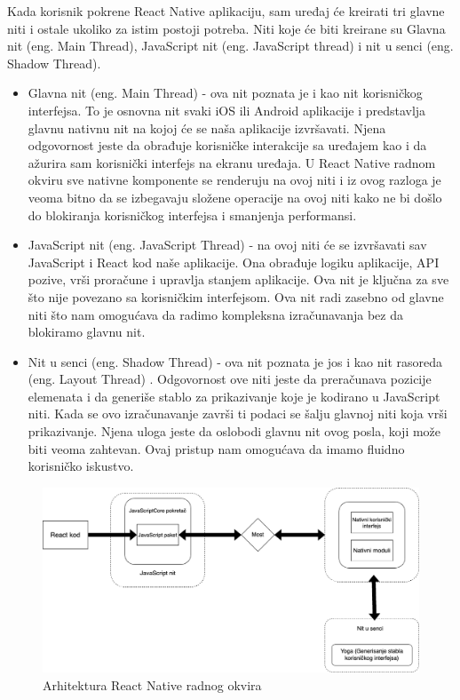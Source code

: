 \documentclass[12pt,oneside]{memoir}
\begin{document}
Kada korisnik pokrene React Native aplikaciju, sam uređaj će kreirati tri glavne niti i ostale ukoliko za istim postoji potreba. Niti koje će biti kreirane su Glavna nit (eng. Main Thread), JavaScript nit (eng. JavaScript thread) i nit u senci (eng. Shadow Thread).

\begin{itemize}
    \item Glavna nit (eng. Main Thread) - ova nit poznata je i kao nit korisničkog interfejsa. To je osnovna nit svaki iOS ili Android aplikacije i predstavlja glavnu nativnu nit na kojoj će se naša aplikacije izvršavati. Njena odgovornost jeste da obrađuje korisničke interakcije sa uređajem kao i da ažurira sam korisnički interfejs na ekranu uređaja. U React Native radnom okviru sve nativne komponente se renderuju na ovoj niti i iz ovog razloga je veoma bitno da se izbegavaju složene operacije na ovoj niti kako ne bi došlo do blokiranja korisničkog interfejsa i smanjenja performansi.
    \item JavaScript nit (eng. JavaScript Thread) - na ovoj niti će se izvršavati sav JavaScript i React kod naše aplikacije. Ona obrađuje logiku aplikacije, API pozive, vrši proračune i upravlja stanjem aplikacije. Ova nit je ključna za sve što nije povezano sa korisničkim interfejsom. Ova nit radi zasebno od glavne niti što nam omogućava da radimo kompleksna izračunavanja bez da blokiramo glavnu nit. 
    \item Nit u senci (eng. Shadow Thread) - ova nit poznata je jos i kao nit rasoreda (eng. Layout Thread) . Odgovornost ove niti jeste da preračunava pozicije elemenata i da generiše stablo za prikazivanje koje je kodirano u JavaScript niti. Kada se ovo izračunavanje završi ti podaci se šalju glavnoj niti koja vrši prikazivanje. Njena uloga jeste da oslobodi glavnu nit ovog posla, koji može biti veoma zahtevan. Ovaj pristup nam omogućava da imamo fluidno korisničko iskustvo.
\end{itemize}

\begin{figure}[h]
    \centering
    \includegraphics[scale=0.4]{docs/images/chapterThree/reactNativeArchitecture.png}
    \caption{Arhitektura React Native radnog okvira}
    \label{fig:reactNativeArchitecture}
\end{figure}
\end{document}
